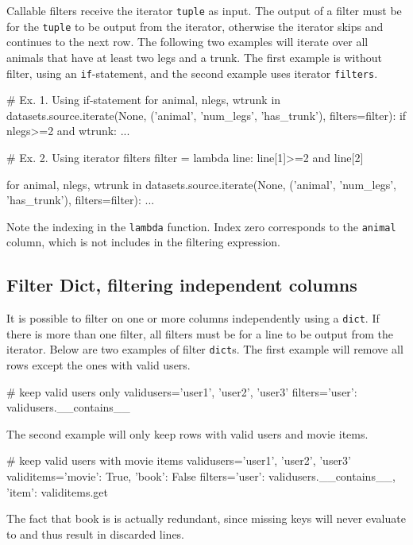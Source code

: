 Callable filters receive the iterator \texttt{tuple} as input.  The
output of a filter must be \pyTrue for the \texttt{tuple} to be output
from the iterator, otherwise the iterator skips and continues to the
next row.  The following two examples will iterate over all animals
that have at least two legs and a trunk.  The first example is without
filter, using an \texttt{if}-statement, and the second example uses
iterator \texttt{filters}.
\begin{python}
# Ex. 1. Using if-statement
for animal, nlegs, wtrunk in datasets.source.iterate(None,
        ('animal', 'num_legs', 'has_trunk'), filters=filter):
        if nlegs>=2 and wtrunk:
    ...

# Ex. 2.  Using iterator filters
filter = lambda line: line[1]>=2 and line[2]

for animal, nlegs, wtrunk in datasets.source.iterate(None,
        ('animal', 'num_legs', 'has_trunk'), filters=filter):
    ...
\end{python}
Note the indexing in the \texttt{lambda} function.  Index zero
corresponds to the \texttt{animal} column, which is not includes in
the filtering expression.



\subsection*{Filter Dict, filtering independent columns}

It is possible to filter on one or more columns independently using a
\texttt{dict}.  If there is more than one filter, all filters must be
\pyTrue for a line to be output from the iterator.
Below are two examples of filter \texttt{dict}s.  The first example
will remove all rows except the ones with valid users.
\begin{python}
# keep valid users only
validusers={'user1', 'user2', 'user3'}
filters={'user': validusers.__contains__}
\end{python}
The second example will only keep rows with valid users and movie
items.
\begin{python}
# keep valid users with movie items
validusers={'user1', 'user2', 'user3'}
validitems={'movie': True, 'book': False}
filters={'user': validusers.__contains__, 'item': validitems.get}
\end{python}
The fact that book is \pyFalse is actually redundant, since
missing keys will never evaluate to \pyTrue and thus result in
discarded lines.




